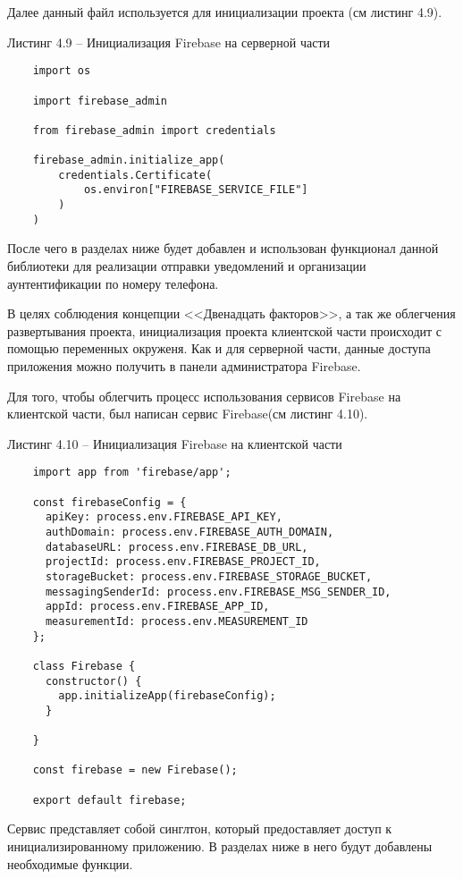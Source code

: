 Далее данный файл используется для инициализации проекта (см листинг 4.9).

\vskip 2cm

Листинг 4.9 – Инициализация Firebase на серверной части
\begin{lstlisting}
    import os

    import firebase_admin

    from firebase_admin import credentials

    firebase_admin.initialize_app(
        credentials.Certificate(
            os.environ["FIREBASE_SERVICE_FILE"]
        )
    )
\end{lstlisting}

После чего в разделах ниже будет добавлен и использован функционал данной библиотеки для реализации отправки уведомлений и организации аунтентификации по номеру телефона.


В целях соблюдения концепции <<Двенадцать факторов>>, а так же облегчения развертывания проекта, инициализация проекта клиентской части происходит с помощью переменных окруженя.
Как и для серверной части, данные доступа приложения можно получить в панели администратора Firebase.

Для того, чтобы облегчить процесс использования сервисов Firebase на клиентской части, был написан сервис Firebase(см листинг 4.10).

Листинг 4.10 – Инициализация Firebase на клиентской части
\begin{lstlisting}
    import app from 'firebase/app';

    const firebaseConfig = {
      apiKey: process.env.FIREBASE_API_KEY,
      authDomain: process.env.FIREBASE_AUTH_DOMAIN,
      databaseURL: process.env.FIREBASE_DB_URL,
      projectId: process.env.FIREBASE_PROJECT_ID,
      storageBucket: process.env.FIREBASE_STORAGE_BUCKET,
      messagingSenderId: process.env.FIREBASE_MSG_SENDER_ID,
      appId: process.env.FIREBASE_APP_ID,
      measurementId: process.env.MEASUREMENT_ID
    };

    class Firebase {
      constructor() {
        app.initializeApp(firebaseConfig);
      }

    }

    const firebase = new Firebase();

    export default firebase;

\end{lstlisting}

Сервис представляет собой синглтон, который предоставляет доступ к инициализированному приложению.
В разделах ниже в него будут добавлены необходимые функции.


